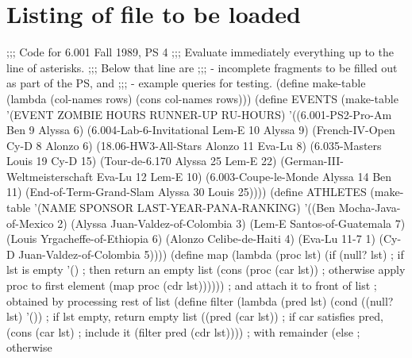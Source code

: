 \newpage

\section{Listing of file to be loaded}

 \beginlisp
;;; Code for 6.001 Fall 1989, PS 4
;;; Evaluate immediately everything up to the line of asterisks.
;;; Below that line are
;;;   - incomplete fragments to be filled out as part of the PS, and
;;;   - example queries for testing.
\null
(define make-table
    (lambda (col-names rows)
      (cons col-names rows)))
\null
(define EVENTS
  (make-table
    '(EVENT                            ZOMBIE     HOURS  RUNNER-UP  RU-HOURS)
    '((6.001-PS2-Pro-Am                 Ben        9      Alyssa     6)
      (6.004-Lab-6-Invitational         Lem-E      10     Alyssa     9)
      (French-IV-Open                   Cy-D       8      Alonzo     6)
      (18.06-HW3-All-Stars              Alonzo     11     Eva-Lu     8)
      (6.035-Masters                    Louis      19     Cy-D       15)
      (Tour-de-6.170                    Alyssa     25     Lem-E      22)
      (German-III-Weltmeisterschaft     Eva-Lu     12     Lem-E      10)
      (6.003-Coupe-le-Monde             Alyssa     14     Ben        11)
      (End-of-Term-Grand-Slam           Alyssa     30     Louis      25))))
\null
(define ATHLETES
  (make-table
    '(NAME       SPONSOR                    LAST-YEAR-PANA-RANKING)
    '((Ben        Mocha-Java-of-Mexico       2)
      (Alyssa     Juan-Valdez-of-Colombia    3)
      (Lem-E      Santos-of-Guatemala        7)
      (Louis      Yrgacheffe-of-Ethiopia     6)
      (Alonzo     Celibe-de-Haiti            4)
      (Eva-Lu     11-7                       1)
      (Cy-D       Juan-Valdez-of-Colombia    5))))
\null
(define map
  (lambda (proc lst)
    (if (null? lst)                    ; if lst is empty
        '()                            ; then return an empty list
        (cons (proc (car lst))         ; otherwise apply proc to first element 
              (map proc (cdr lst)))))) ; and attach it to front of list
                                       ; obtained by processing rest of list
\null
(define filter
  (lambda (pred lst)
    (cond
      ((null? lst)      '())                  ; if lst empty, return empty list
      ((pred (car lst))                       ; if car satisfies pred,
           (cons (car lst)                    ;    include it
                 (filter pred (cdr lst))))    ;            with  remainder
      (else                                   ; otherwise
